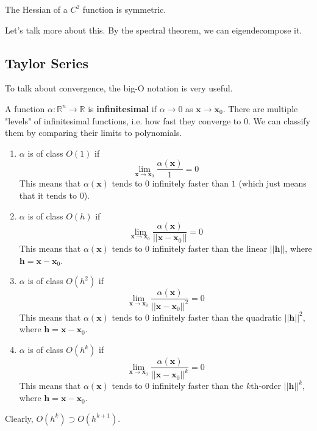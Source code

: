   \begin{corollary}
    The Hessian of a $C^2$ function is symmetric. 
  \end{corollary}

  Let's talk more about this. By the spectral theorem, we can eigendecompose it. 

\subsection{Taylor Series}

  To talk about convergence, the big-O notation is very useful. 

  \begin{definition}
  A function $\alpha: \mathbb{R}^n \longrightarrow \mathbb{R}$ is \textbf{infinitesimal} if $\alpha \rightarrow 0$ as $\mathbf{x} \rightarrow \mathbf{x}_0$. There are multiple "levels" of infinitesimal functions, i.e. how fast they converge to $0$. We can classify them by comparing their limits to polynomials. 
  \begin{enumerate}
    \item $\alpha$ is of class $O(1)$ if 
    \[\lim_{\mathbf{x} \rightarrow \mathbf{x}_0} \frac{\alpha(\mathbf{x})}{1} = 0\]
    This means that $\alpha(\mathbf{x})$ tends to $0$ infinitely faster than $1$ (which just means that it tends to $0$). 
    
    \item $\alpha$ is of class $O(h)$ if 
    \[\lim_{\mathbf{x} \rightarrow \mathbf{x}_0}
    \frac{\alpha(\mathbf{x})}{||\mathbf{x} - \mathbf{x}_0||} = 0\]
    This means that $\alpha(\mathbf{x})$ tends to $0$ infinitely faster than the linear $||\mathbf{h}||$, where $\mathbf{h} = \mathbf{x} - \mathbf{x}_0$. 
    
    \item $\alpha$ is of class $O(h^2)$ if 
    \[\lim_{\mathbf{x} \rightarrow \mathbf{x}_0} \frac{\alpha(\mathbf{x})}{||\mathbf{x} - \mathbf{x}_0||^2} = 0\]
    This means that $\alpha(\mathbf{x})$ tends to $0$ infinitely faster than the quadratic $||\mathbf{h}||^2$, where $\mathbf{h} = \mathbf{x} - \mathbf{x}_0$. 
    
    \item $\alpha$ is of class $O(h^k)$ if 
    \[\lim_{\mathbf{x} \rightarrow \mathbf{x}_0} \frac{\alpha(\mathbf{x})}{||\mathbf{x} - \mathbf{x}_0||^k} = 0\]
    This means that $\alpha(\mathbf{x})$ tends to $0$ infinitely faster than the $k$th-order $||\mathbf{h}||^k$, where $\mathbf{h} = \mathbf{x} - \mathbf{x}_0$. 
  \end{enumerate}
  Clearly, $O(h^k) \supset O(h^{k+1})$. 
  \end{definition}

